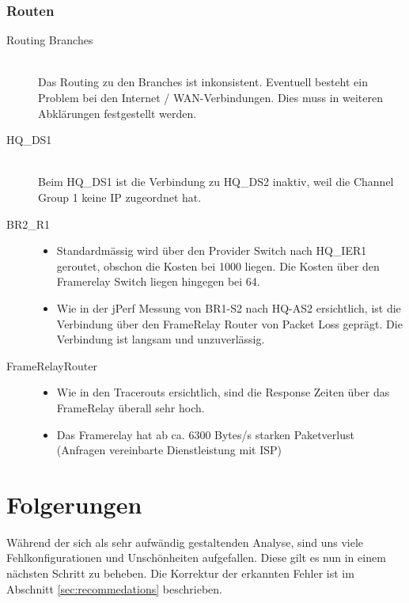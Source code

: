 \subsubsection{Routen}
\begin{description}
	\item[Routing Branches] \hfill \\
	Das Routing zu den Branches ist inkonsistent. Eventuell besteht ein Problem bei den Internet / WAN-Verbindungen. Dies muss in weiteren Abklärungen festgestellt werden.
	\item[HQ\_DS1] \hfill \\
	Beim HQ\_DS1 ist die Verbindung zu HQ\_DS2 inaktiv, weil die Channel Group 1 keine IP zugeordnet hat.
	\item[BR2\_R1] \hfill 
		\begin{itemize}
			\item Standardmässig wird über den Provider Switch nach HQ\_IER1 geroutet, obschon die Kosten bei 1000 liegen. Die Kosten über den Framerelay Switch liegen hingegen bei 64.
			\item Wie in der jPerf Messung von BR1-S2 nach HQ-AS2 ersichtlich, ist die Verbindung über den FrameRelay Router von Packet Loss geprägt. Die Verbindung ist langsam und unzuverlässig.
		\end{itemize}
	\item[FrameRelayRouter] \hfill
		\begin{itemize}
			\item Wie in den Tracerouts ersichtlich, sind die Response Zeiten über das FrameRelay überall sehr hoch.
			\item Das Framerelay hat ab ca. 6300 Bytes/s starken Paketverlust (Anfragen vereinbarte Dienstleistung mit ISP)
		\end{itemize}
\end{description}
	
\section{Folgerungen}
Während der sich als sehr aufwändig gestaltenden Analyse, sind uns viele Fehlkonfigurationen und Unschönheiten aufgefallen. Diese gilt es nun in einem nächsten Schritt zu beheben. Die Korrektur der erkannten Fehler ist im Abschnitt \ref{sec:recommedations} beschrieben. 

